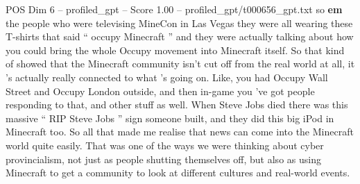 \begin{textsample}{POS Dim 6 – profiled\_gpt – Score 1.00 – profiled\_gpt/t000656\_gpt.txt}  \label{ex:f6_pos_040}
so \textbf{em} the people who were televising MineCon in Las Vegas they were all wearing these T-shirts that said “ occupy Minecraft ” and they were actually talking about how you could bring the whole Occupy movement into Minecraft itself.
So that kind of showed that the Minecraft community isn't cut off from the real world at all, it ’s actually really connected to what ’s going on.
Like, you had Occupy Wall Street and Occupy London outside, and then in-game you ’ve got people responding to that, and other stuff as well.
When Steve Jobs died there was this massive “ RIP Steve Jobs ” sign someone built, and they did this big iPod in Minecraft too.
So all that made me realise that news can come into the Minecraft world quite easily.
That was one of the ways we were thinking about cyber provincialism, not just as people shutting themselves off, but also as using Minecraft to get a community to look at different cultures and real-world events.

\end{textsample}
